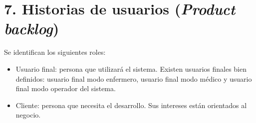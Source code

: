 \documentclass[
11pt, %
]{charter}
\begin{document}
\section{7. Historias de usuarios (\textit{Product backlog})}
\label{sec:backlog}



Se identifican los siguientes roles:
\begin{itemize}
	\item Usuario final: persona que utilizará el sistema. Existen  usuarios finales bien definidos: usuario final modo enfermero, usuario final modo médico y usuario final modo operador del sistema.
	\item Cliente: persona que necesita el desarrollo. Sus intereses están orientados al negocio.

\end{itemize}
\end{document}
